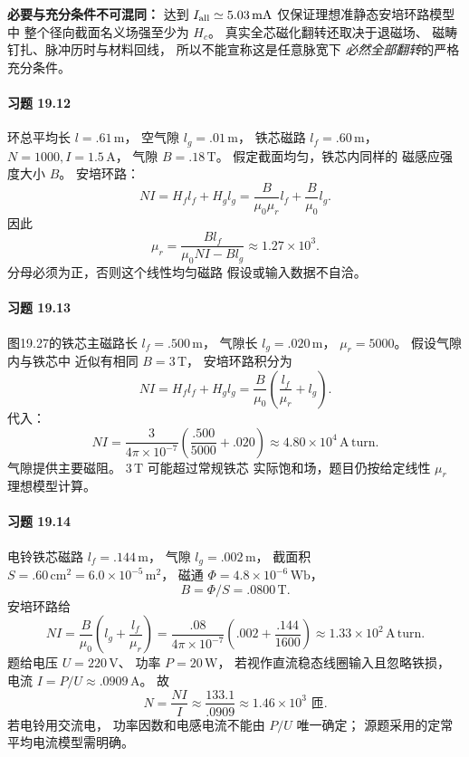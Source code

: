 \textbf{必要与充分条件不可混同：}
达到 \(I_{\rm all}\simeq5.03\,\mathrm{mA}\)
仅保证理想准静态安培环路模型中
整个径向截面名义场强至少为 \(H_c\)。
真实全芯磁化翻转还取决于退磁场、
磁畴钉扎、脉冲历时与材料回线，
所以不能宣称这是任意脉宽下
\emph{必然全部翻转}的严格充分条件。


\paragraph{习题 19.12}
环总平均长 \(l=.61\,\mathrm m\)，
空气隙 \(l_g=.01\,\mathrm m\)，
铁芯磁路 \(l_f=.60\,\mathrm m\)，
\(N=1000,I=1.5\,\mathrm A\)，
气隙 \(B=.18\,\mathrm T\)。
假定截面均匀，铁芯内同样的
磁感应强度大小 \(B\)。
安培环路：
\[
 NI=H_fl_f+H_gl_g
 =\frac B{\mu_0\mu_r}l_f+
 \frac B{\mu_0}l_g.
\]
因此
\[
 \boxed{\mu_r=
 \frac{Bl_f}{\mu_0NI-Bl_g}
 \approx1.27\times10^3}.
\]
分母必须为正，否则这个线性均匀磁路
假设或输入数据不自洽。

\paragraph{习题 19.13}
图19.27的铁芯主磁路长
\(l_f=.500\,\mathrm m\)，
气隙长 \(l_g=.020\,\mathrm m\)，
\(\mu_r=5000\)。
假设气隙内与铁芯中
近似有相同 \(B=3\,\mathrm T\)，
安培环路积分为
\[
 NI=H_fl_f+H_gl_g
 =\frac B{\mu_0}
 \left(\frac{l_f}{\mu_r}+l_g\right).
\]
代入：
\[
 \boxed{NI=\frac3{4\pi\times10^{-7}}
 \left(\frac{.500}{5000}+.020\right)
 \approx4.80\times10^4\,\mathrm{A\,turn}}.
\]
气隙提供主要磁阻。
\(3\,\mathrm T\) 可能超过常规铁芯
实际饱和场，题目仍按给定线性
\(\mu_r\) 理想模型计算。

\paragraph{习题 19.14}
电铃铁芯磁路 \(l_f=.144\,\mathrm m\)，
气隙 \(l_g=.002\,\mathrm m\)，
截面积 \(S=.60\,\mathrm{cm^2}
 =6.0\times10^{-5}\,\mathrm{m^2}\)，
磁通 \(\Phi=4.8\times10^{-6}\,\mathrm{Wb}\)，
\[
 \boxed{B=\Phi/S=.0800\,\mathrm T}.
\]
安培环路给
\[
 \boxed{NI=\frac B{\mu_0}
 \left(l_g+\frac{l_f}{\mu_r}\right)
 =\frac{.08}{4\pi\times10^{-7}}
 \left(.002+\frac{.144}{1600}\right)
 \approx1.33\times10^2\,\mathrm{A\,turn}}.
\]
题给电压 \(U=220\,\mathrm V\)、
功率 \(P=20\,\mathrm W\)，
若视作直流稳态线圈输入且忽略铁损，
电流
\(I=P/U\approx.0909\,\mathrm A\)。
故
\[
 \boxed{N=\frac{NI}{I}
 \approx\frac{133.1}{.0909}
 \approx1.46\times10^3\text{ 匝}}.
\]
若电铃用交流电，
功率因数和电感电流不能由
\(P/U\) 唯一确定；
源题采用的定常平均电流模型需明确。
